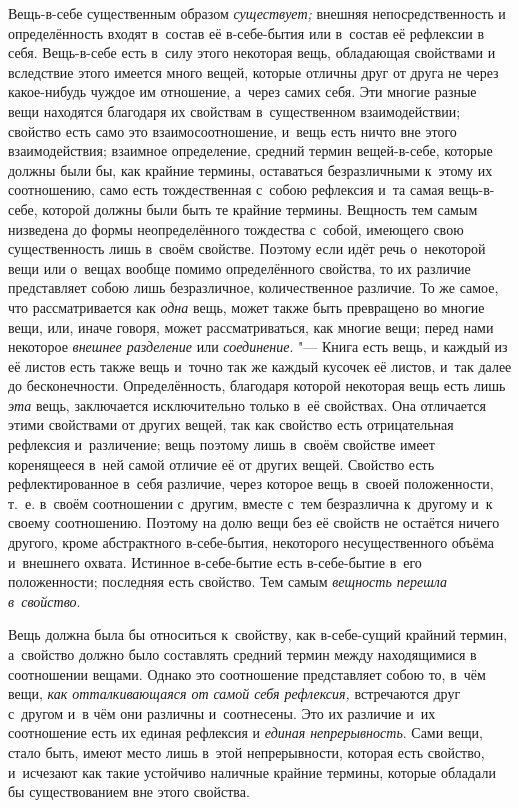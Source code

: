 Вещь-в-себе существенным образом
{\em существует;} внешняя непосредственность и
определённость входят в~состав её в-себе-бытия или в~состав её рефлексии в
себя. Вещь-в-себе есть в~силу этого некоторая вещь, обладающая свойствами и
вследствие этого имеется много вещей, которые отличны друг от друга не
через какое-нибудь чуждое им отношение, а~через самих себя. Эти многие
разные вещи находятся благодаря их свойствам в~существенном взаимодействии;
свойство есть само это взаимосоотношение, и~вещь есть ничто вне этого
взаимодействия; взаимное определение, средний термин вещей-в-себе, которые
должны были бы, как крайние термины, оставаться безразличными к~этому их
соотношению, само есть тождественная с~собою рефлексия и~та самая
вещь-в-себе, которой должны были быть те крайние термины. Вещность тем
самым низведена до формы неопределённого тождества с~собой, имеющего свою
существенность лишь в~своём свойстве. Поэтому если идёт речь о~некоторой
вещи или о~вещах вообще помимо определённого свойства, то их различие
представляет собою лишь безразличное, количественное различие. То же самое,
что рассматривается как {\em одна} вещь, может также
быть превращено во многие вещи, или, иначе говоря, может рассматриваться,
как многие вещи; перед нами некоторое {\em внешнее
разделение} или {\em соединение}. "--- Книга есть вещь, и
каждый из её листов есть также вещь и~точно так же каждый кусочек её
листов, и~так далее до бесконечности. Определённость, благодаря которой
некоторая вещь есть лишь {\em эта} вещь, заключается
исключительно только в~её свойствах. Она отличается этими свойствами от
других вещей, так как свойство есть отрицательная рефлексия и~различение;
вещь поэтому лишь в~своём свойстве имеет коренящееся в~ней самой отличие её
от других вещей. Свойство есть рефлектированное в~себя различие, через
которое вещь в~своей положенности, т.~е. в~своём соотношении с~другим,
вместе с~тем безразлична к~другому и~к своему соотношению. Поэтому на долю
вещи без её свойств не остаётся ничего другого, кроме абстрактного
в-себе-бытия, некоторого несущественного объёма и~внешнего охвата. Истинное
в-себе-бытие есть в-себе-бытие в~его положенности; последняя есть свойство.
Тем самым {\em вещность перешла в~свойство}.

Вещь должна была бы относиться к~свойству, как в-себе-сущий крайний термин,
а~свойство должно было составлять средний термин между находящимися в
соотношении вещами. Однако это соотношение представляет собою то, в~чём
вещи, {\em как отталкивающаяся от самой себя
рефлексия,} встречаются друг с~другом и~в чём они различны и~соотнесены.
Это их различие и~их соотношение есть их единая рефлексия и
{\em единая непрерывность}. Сами вещи, стало быть,
имеют место лишь в~этой непрерывности, которая есть свойство, и~исчезают
как такие устойчиво наличные крайние термины, которые обладали бы
существованием вне этого свойства.

